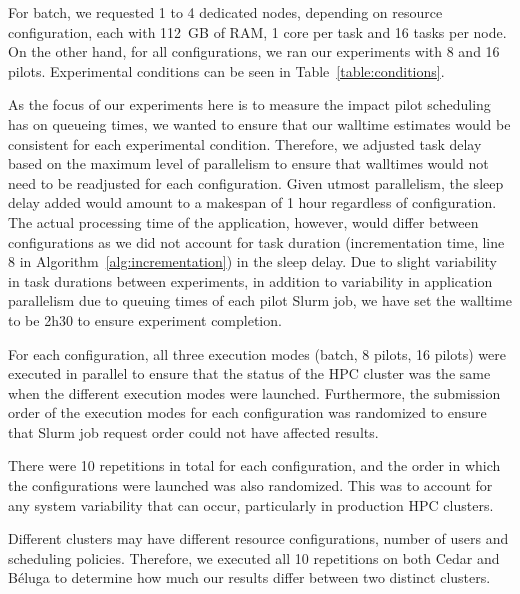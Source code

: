 \documentclass{IEEEtran}
\begin{document}
       For batch, we requested 1 to 4 dedicated nodes, depending on resource 
       configuration, each with 112~GB of RAM, 1 core per task and 16 tasks per 
       node. On the other hand, for all configurations, we ran our experiments
       with 8 and 16 pilots. Experimental conditions can be seen in Table~\ref{table:conditions}.

       As the focus of our experiments here is to measure the impact pilot scheduling
       has on queueing times, we wanted to ensure that our walltime estimates would
       be consistent for each experimental condition. Therefore, we adjusted task 
       delay based on the maximum level of parallelism to ensure that walltimes would
       not need to be readjusted for each configuration. Given utmost parallelism,
       the sleep delay added would amount to a makespan of 1 hour regardless
       of configuration. The actual processing time of the application, however, 
       would differ between configurations as we did not account for task duration (incrementation time, line
       8 in Algorithm~\ref{alg:incrementation})
       in the sleep delay. Due to slight variability in task durations between experiments, in 
       addition to variability in application parallelism due to queuing times of each pilot Slurm job, 
       we have set the walltime to be 2h30 to ensure experiment completion.

       For each configuration, all three execution modes (batch, 8 pilots,
       16 pilots) were executed in parallel to ensure that the status of
       the HPC cluster was the same when the different execution modes
       were launched. Furthermore, the submission order of the execution
       modes for each configuration was randomized to ensure that Slurm job
       request order could not have affected results. 

       There were 10 repetitions in total for each configuration, and the order
       in which the configurations were launched was also randomized. This was to 
       account for any system variability that can occur, particularly in production
       HPC clusters. 

       Different clusters may have different resource configurations, number of 
       users and scheduling policies. Therefore, we executed all 10 repetitions on
       both Cedar and B\'eluga to determine how much our results differ between
       two distinct clusters.

\end{document}
